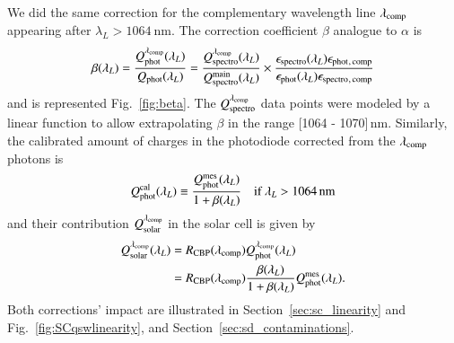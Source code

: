 We did the same correction for the complementary wavelength line $\lambda_{\rm comp}$ appearing after $\lambda_L > \SI{1064}{\nm}$. The correction coefficient $\beta$ analogue to $\alpha$ is
\begin{equation}
    \beta(\lambda_L) = \frac{Q_{\mathrm{phot}}^{\lambda_{\rm comp}}(\lambda_L)}{Q_{\mathrm{phot}}(\lambda_L)} = \frac{Q_{\mathrm{spectro}}^{\lambda_{\rm comp}}(\lambda_L)}{Q_{\mathrm{spectro}}^{\mathrm{main}}(\lambda_L)} \times \frac{\epsilon_{\mathrm{spectro}}(\lambda_L)\epsilon_{\mathrm{phot}}{}_{\mathrm{, \, comp}}}{\epsilon_{\mathrm{phot}}(\lambda_L)\epsilon_{\mathrm{spectro}}{}_{\mathrm{, \, comp}}} 
    \label{eq:beta}
\end{equation}
and is represented Fig.~\ref{fig:beta}. The $Q_{\mathrm{spectro}}^{\lambda_{\rm comp}}$ data points were modeled by a linear function to allow extrapolating $\beta$ in the range [1064 - 1070]\,nm. Similarly, the calibrated amount of charges in the photodiode corrected from the $\lambda_{\rm comp}$ photons is
\begin{equation}
        Q_{\mathrm{phot}}^{\mathrm{cal}}(\lambda_L) \equiv  \frac{Q_{\mathrm{phot}}^{\mathrm{mes}}(\lambda_L)}{1 + \beta(\lambda_L)} \quad\text{if}\ \lambda_L > \SI{1064}{\nano\meter}
        \label{eq:qphot_cal1064}
\end{equation}
and their contribution $Q_{\mathrm{solar}}^{\lambda_{\rm comp}}$ in the solar cell is given by
\begin{equation}
\begin{aligned}
    Q_{\mathrm{solar}}^{\lambda_{\rm comp}}(\lambda_L) & = R_{\mathrm{CBP}}(\lambda_{\rm comp})  Q_{\mathrm{phot}}^{\lambda_{\rm comp}}(\lambda_L) \\ 
    & = R_{\mathrm{CBP}}(\lambda_{\rm comp}) \frac{ \beta(\lambda_L) }{1+ \beta(\lambda_L)} Q_{\mathrm{phot}}^{\mathrm{mes}}(\lambda_L).
    \label{eq:qsolar_cal1064}
\end{aligned}
\end{equation}
Both corrections' impact are illustrated in Section~\ref{sec:sc_linearity} and Fig.~\ref{fig:SCqswlinearity}, and Section~\ref{sec:sd_contaminations}.


